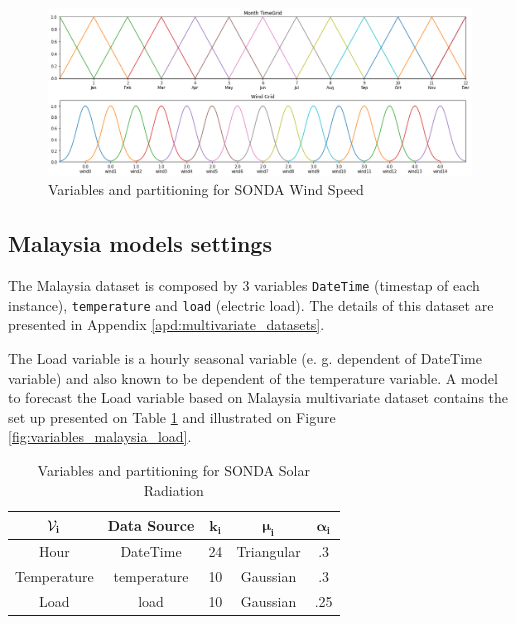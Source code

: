 \begin{figure}[htb]
    \centering
    \includegraphics[width=\textwidth]{figures/variables_sonda_wind.png}
    \caption{Variables and partitioning for SONDA Wind Speed}
    \label{fig:variables_sonda_wind}
\end{figure}

\subsection{Malaysia models settings}
\label{sec:variables_malaysia}

The Malaysia dataset is composed by 3 variables \texttt{DateTime} (timestap of each instance), \texttt{temperature} and \texttt{load} (electric load). The details of this dataset are presented in Appendix \ref{apd:multivariate_datasets}.

The Load variable is a hourly seasonal variable (e. g. dependent of DateTime variable) and also known to be dependent of the temperature variable. A model to forecast the Load variable based on Malaysia multivariate dataset contains the set up presented on Table \ref{tab:variables_malaysia_load} and illustrated on Figure \ref{fig:variables_malaysia_load}. 

\begin{table}[htb]
    \centering
    \begin{tabular}{|c|c|c|c|c|} \hline
        $\mathbf{\mathcal{V}_i}$ & \textbf{Data Source} & $\mathbf{k_i}$ & $\mathbf{\mu_i}$ & $\mathbf{\alpha_i}$  \\ \hline
        Hour & DateTime & 24 & Triangular & .3 \\ \hline 
        Temperature & temperature & 10 & Gaussian & .3 \\ \hline 
        Load & load & 10 & Gaussian & .25 \\ \hline 
    \end{tabular}
    \caption{Variables and partitioning for SONDA Solar Radiation}
    \label{tab:variables_malaysia_load}
\end{table}

